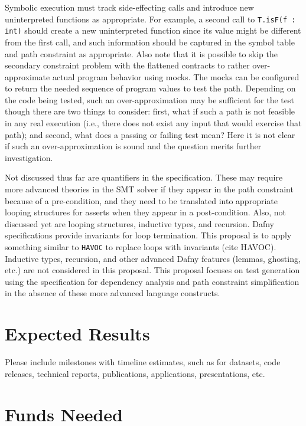 \documentclass[11pt,onecolumn,notitlepage]{article}
\begin{document}
Symbolic execution must track side-effecting calls and introduce new uninterpreted functions as appropriate. For example, a second call to \texttt{T.isF(f : int)} should create a new uninterpreted function since its value might be different from the first call, and such information should be captured in the symbol table and path constraint as appropriate. Also note that it is possible to skip the secondary constraint problem with the flattened contracts to rather over-approximate actual program behavior using mocks. The mocks can be configured to return the needed sequence of program values to test the path. Depending on the code being tested, such an over-approximation may be sufficient for the test though there are two things to consider: first, what if such a path is not feasible in any real execution (i.e., there does not exist any input that would exercise that path); and second, what does a passing or failing test mean? Here it is not clear if such an over-approximation is sound and the question merits further investigation.

Not discussed thus far are quantifiers in the specification. These may require more advanced theories in the SMT solver if they appear in the path constraint because of a pre-condition, and they need to be translated into appropriate looping structures for asserts when they appear in a post-condition.  Also, not discussed yet are looping structures, inductive types, and recursion. Dafny specifications provide invariants for loop termination. This proposal is to apply something similar to \texttt{HAVOC} to replace loops with invariants (cite HAVOC). Inductive types, recursion, and other advanced Dafny features (lemmas, ghosting, etc.) are not considered in this proposal. This proposal focuses on test generation using the specification for dependency analysis and path constraint simplification in the absence of these more advanced language constructs.

\section*{Expected Results}
Please include milestones with timeline estimates, such as for datasets, code releases, technical reports, publications, applications, presentations, etc. 

\section*{Funds Needed}
\end{document}
